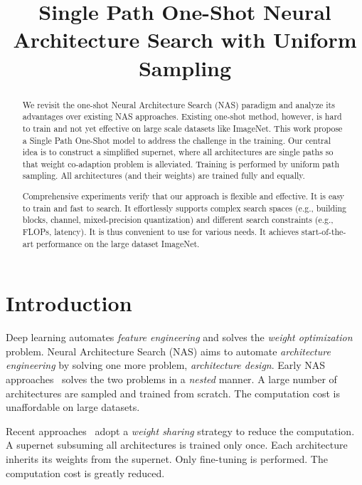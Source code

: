 \title{Single Path One-Shot Neural Architecture Search with Uniform Sampling}

\begin{abstract}
We revisit the one-shot Neural Architecture Search (NAS) paradigm and analyze its advantages over existing NAS approaches. Existing one-shot method, however, is hard to train and not yet effective on large scale datasets like ImageNet. This work propose a Single Path One-Shot model to address the challenge in the training. Our central idea is to construct a simplified supernet, where all architectures are single paths so that weight co-adaption problem is alleviated. Training is performed by uniform path sampling. All architectures (and their weights) are trained fully and equally.

Comprehensive experiments verify that our approach is flexible and effective. It is easy to train and fast to search. It effortlessly supports complex search spaces (e.g., building blocks, channel, mixed-precision quantization) and different search constraints (e.g., FLOPs, latency). It is thus convenient to use for various needs. It achieves start-of-the-art performance on the large dataset ImageNet.
\end{abstract}

\section{Introduction}
\label{sec:intro}

Deep learning automates \emph{feature engineering} and solves the \emph{weight optimization} problem. Neural Architecture Search (NAS) aims to automate \emph{architecture engineering} by solving one more problem, \emph{architecture design}. Early NAS approaches~\cite{zoph2018learning,zhong2018practical,zhong2018blockqnn,liu2018progressive,real2018regularized,tan2018mnasnet} solves the two problems in a \emph{nested} manner. A large number of architectures are sampled and trained from scratch. The computation cost is unaffordable on large datasets.

Recent approaches~\cite{wu2018fbnet,cai2018proxylessnas,liu2018darts,xie2018snas,pham2018efficient,zhang2018you,brock2017smash,bender2018understanding} adopt a \emph{weight sharing} strategy to reduce the computation. A supernet subsuming all architectures is trained only once. Each architecture inherits its weights from the supernet. Only fine-tuning is performed. The computation cost is greatly reduced. 

